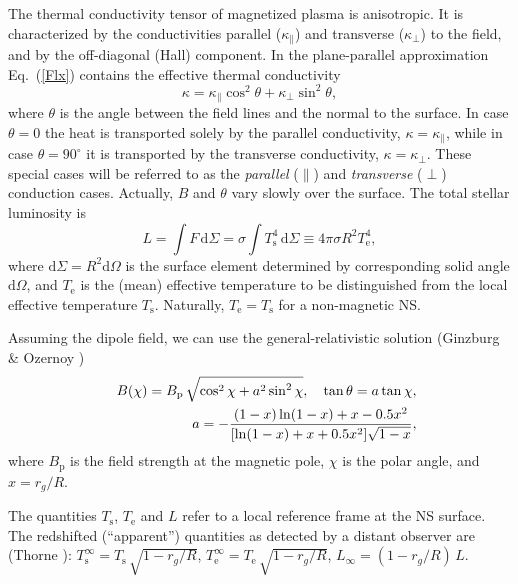\documentclass{aa}
\begin{document}
The thermal conductivity tensor of magnetized plasma is anisotropic.
It is characterized by the conductivities parallel ($\kappa_\|$)
and transverse ($\kappa_\perp$) to the field, and by the 
off-diagonal (Hall) component.
In the plane-parallel approximation Eq.~(\ref{Flx})
contains the effective thermal conductivity
%
\begin{equation}
   \kappa=\kappa_\|\cos^2\theta + \kappa_\perp\sin^2\theta,
\end{equation}
%
where $\theta$ is the angle between the field lines 
and the normal to the surface.
In case $\theta=0$ the heat is transported solely
by the parallel conductivity, $\kappa=\kappa_\|$,
while in case $\theta=90^\circ$ it is transported
by the transverse conductivity, $\kappa=\kappa_\perp$.
These special cases will be referred to as the \emph{parallel} ($\|$)
and \emph{transverse} ($\perp$) conduction cases. 
Actually, $B$ and $\theta$ vary slowly over the surface.
The total stellar luminosity is
%
\begin{equation}
   L= 
 \int F \,\mathrm{d}\Sigma =
\sigma \int T_\mathrm{s}^4 \,\mathrm{d}\Sigma
   \equiv 4 \pi \sigma R^2 T_\mathrm{e}^4,
\label{L}
\end{equation}
%
where $\mathrm{d}\Sigma=R^2 \mathrm{d}\Omega$ is the surface
element determined by corresponding solid angle $\mathrm{d}\Omega$,
and $T_\mathrm{e}$ is the (mean) effective 
temperature to be distinguished from the local effective
temperature $T_\mathrm{s}$. 
Naturally, $T_\mathrm{e}=T_\mathrm{s}$ for
a non-magnetic NS.

Assuming the dipole field, we
can use the general-relativistic solution
(Ginzburg \& Ozernoy \cite{GinzOz})
\begin{eqnarray}
&&
  B(\chi) = B_\mathrm{p}\,\sqrt{\cos^2\chi+a^2\sin^2\chi},
  \label{dipole}
\quad
  \mathrm{tan}\,\theta = a\,\mathrm{tan}\,\chi,
\\&&
  a = - {(1-x) \ln(1-x) + x - 0.5 x^2
        \over [ \ln(1-x)+x + 0.5 x^2] \sqrt{1-x}},
\end{eqnarray}
%
where $B_\mathrm{p}$ is the field strength at the magnetic pole,
$\chi$ is the polar angle, and $x=r_g/R$.

The quantities $T_\mathrm{s}$, $T_\mathrm{e}$ and $L$
refer to a local reference frame at the NS surface.
The redshifted (``apparent'') quantities
as detected by a distant observer are (Thorne \cite{thorne}):
$T_\mathrm{s}^\infty = T_\mathrm{s} \, \sqrt{1-r_g/R}$,
$T_\mathrm{e}^\infty = T_\mathrm{e} \, \sqrt{1-r_g/R}$,
$L_\infty = (1-r_g/R)\, L$.
\end{document}

